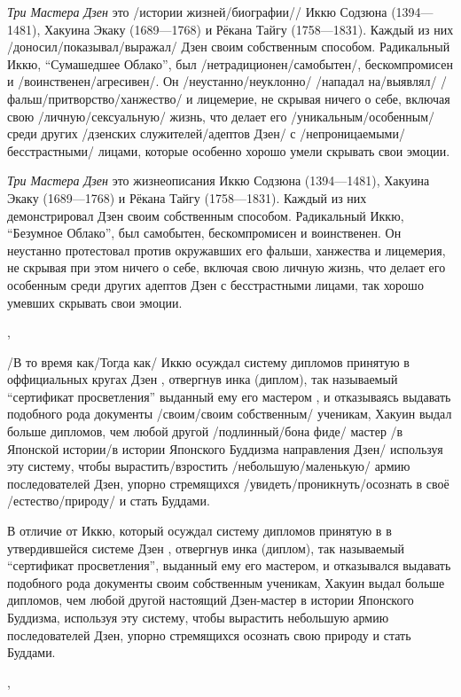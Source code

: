 
\begin{ver} 
{\em Три Мастера Дзен} это /истории
жизней/биографии// Иккю Содзюна (1394---1481),
Хакуина Экаку (1689---1768) и Рёкана Тайгу (1758---1831).  Каждый из
них /доносил/показывал/выражал/ Дзен своим собственным способом.
Радикальный Иккю, ``Сумашедшее Облако'', был
/нетрадиционен/самобытен/, бескомпромисен и
/воинственен/агресивен/.  Он /неустанно/неуклонно/ /нападал
на/выявлял/ /фальш/притворство/ханжество/ и лицемерие,
не скрывая ничего о себе, включая свою /личную/сексуальную/ жизнь, что
делает его /уникальным/особенным/ среди других /дзенских
служителей/адептов Дзен/ с /непроницаемыми/бесстрастными/ лицами,
которые особенно хорошо умели скрывать свои эмоции.
\end{ver}

\begin{ver}[1] 
{\em Три Мастера Дзен} это жизнеописания Иккю Содзюна
(1394---1481), Хакуина Экаку (1689---1768) и Рёкана Тайгу
(1758---1831).  Каждый из них демонстрировал Дзен своим
собственным способом. 
 Радикальный Иккю, ``Безумное Облако'', был
самобытен, бескомпромисен и
воинственен. Он неустанно протестовал против окружавших его
фальши, ханжества и лицемерия, не скрывая при этом ничего о себе,
включая свою личную жизнь, что делает его
особенным среди других адептов Дзен
с бесстрастными лицами, так хорошо умевших
скрывать свои эмоции.
\end{ver}
\sep

\begin{ver}
/В то время как/Тогда как/ Иккю осуждал систему дипломов принятую в
оффициальных кругах Дзен , отвергнув инка (диплом), так
называемый ``сертификат просветления'' выданный ему его мастером
, и отказываясь выдавать подобного рода
документы /своим/своим собственным/ ученикам, Хакуин выдал больше
дипломов, чем любой другой /подлинный/бона фиде/ мастер /в Японской
истории/в истории Японского Буддизма направления Дзен/ используя эту
систему, чтобы вырастить/взростить /небольшую/маленькую/ армию
последователей  Дзен, упорно стремящихся
/увидеть/проникнуть/осознать в своё /естество/природу/ и стать
Буддами. 
\end{ver}

\begin{ver}[1]
В отличие от Иккю, который осуждал систему дипломов принятую в в
утвердившейся системе Дзен , отвергнув инка
(диплом), так называемый ``сертификат просветления'', выданный ему его
мастером, и отказывался выдавать подобного рода документы своим
собственным ученикам, Хакуин выдал больше дипломов, чем любой другой
настоящий Дзен-мастер в истории Японского Буддизма, используя эту
систему, чтобы вырастить небольшую армию последователей Дзен, упорно
стремящихся осознать свою природу и стать Буддами.
\end{ver}
\sep

